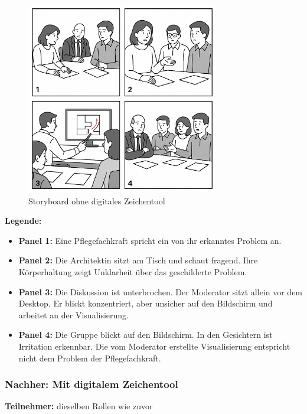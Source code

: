 \begin{figure}[H]
    \centering
    \includegraphics[width=0.75\textwidth]{graphics/UserStory_without_Solution.png}
    \caption{Storyboard ohne digitales Zeichentool}
    \label{fig:userstory-ohne}
\end{figure}

\textbf{Legende:}
\begin{itemize}
    \item \textbf{Panel 1:} Eine Pflegefachkraft spricht ein von ihr erkanntes Problem an.
    \item \textbf{Panel 2:} Die Architektin sitzt am Tisch und schaut fragend. Ihre Körperhaltung zeigt Unklarheit über das geschilderte Problem.
    \item \textbf{Panel 3:} Die Diskussion ist unterbrochen. Der Moderator sitzt allein vor dem Desktop. Er blickt konzentriert, aber unsicher auf den Bildschirm und arbeitet an der Visualisierung.
    \item \textbf{Panel 4:} Die Gruppe blickt auf den Bildschirm. In den Gesichtern ist Irritation erkennbar. Die vom Moderator erstellte Visualisierung entspricht nicht dem Problem der Pflegefachkraft.
\end{itemize}

\clearpage

\subsubsection*{Nachher: Mit digitalem Zeichentool}

\textbf{Teilnehmer:} dieselben Rollen wie zuvor

